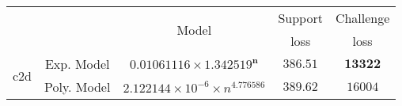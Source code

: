 \begin{tabular}{ccccc} 
\hline 
 &  & \multirow{2}{*}{Model} & Support & Challenge\tabularnewline 
 &  &  & loss  & loss\tabularnewline 
\hline 
\hline 
\multirow{2}{*}{c2d} & Exp. Model & $\mathbf{0.01061116\times 1.342519^{n}}$ & $\mathbf{386.51}$ & $\mathbf{13322}$ \tabularnewline 
 & Poly. Model & $2.122144\times10^{-6}\times n^{4.776586}$ & $389.62$ & $16004$ \tabularnewline 
\hline 
\end{tabular} 

